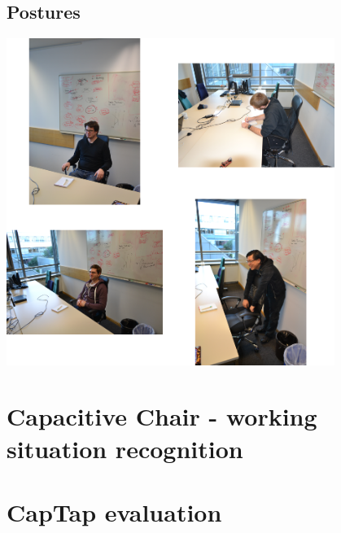 \subsection{Postures}
\begin{minipage}{\linewidth}
\centering
\includegraphics[width=0.8\textwidth]{images/app_eval_chair1}
\label{fig:disc_unob_elec}
\end{minipage}

\section{Capacitive Chair - working situation recognition}

\section{CapTap evaluation}

